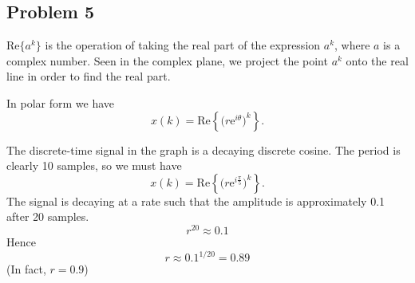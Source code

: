 \documentclass[a4paper,12pt]{article}
\newcommand{\realdel}[1]{\text{Re}\left\{#1\right\}}
\newcommand*{\mexp}[1]{\ensuremath{\mathrm{e}^{#1}}}
\begin{document}
\subsection*{Problem 5}
$\mathrm{Re}\{a^k\}$ is the operation of taking the real part of the expression $a^k$, where $a$ is a complex number. Seen in the complex plane, we project the point $a^k$ onto the real line in order to find the real part. 

In polar form we have
\[ x(k) = \realdel{\Big(r\mexp{i\theta}\Big)^k}. \]

The discrete-time signal in the graph is a decaying discrete cosine. The period is clearly 10 samples, so we must have
\[ x(k) = \realdel{\Big(r\mexp{i\frac{\pi}{5}}\Big)^k}. \]
The signal is decaying at a rate such that the amplitude is approximately 0.1 after 20 samples.
\[ r^{20} \approx 0.1\]
Hence \[ r \approx 0.1^{1/20} = 0.89 \] (In fact, $r=0.9$)
\end{document}
